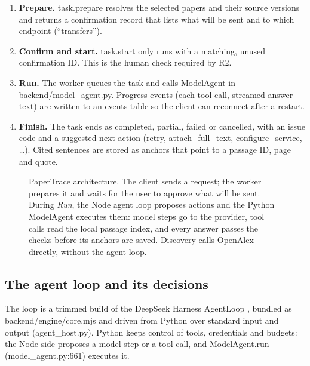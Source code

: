 \documentclass{article}
\newcommand{\code}[1]{{\ttfamily\small\hyphenchar\font=-1\relax #1}}
\begin{document}
\begin{enumerate}
  \item \textbf{Prepare.} \code{task.prepare} resolves the selected papers and their source versions and
  returns a confirmation record that lists what will be sent and to which endpoint (``transfers'').
  \item \textbf{Confirm and start.} \code{task.start} only runs with a matching, unused confirmation ID.
  This is the human check required by R2.
  \item \textbf{Run.} The worker queues the task and calls \code{ModelAgent} in
  \code{backend/model_agent.py}. Progress events (each tool call, streamed answer text) are written to
  an \code{events} table so the client can reconnect after a restart.
  \item \textbf{Finish.} The task ends as \code{completed}, \code{partial}, \code{failed} or
  \code{cancelled}, with an \code{issue} code and a suggested next action (\code{retry},
  \code{attach\_full\_text}, \code{configure\_service}, \ldots). Cited sentences are stored as anchors
  that point to a passage ID, page and quote.
\end{enumerate}

\begin{figure}[H]
  \centering
  
  \caption{PaperTrace architecture. The client sends a request; the worker prepares it and waits for
  the user to approve what will be sent. During \emph{Run}, the Node agent loop proposes actions and the
  Python \code{ModelAgent} executes them: model steps go to the provider, tool calls read the local
  passage index, and every answer passes the checks before its anchors are saved. Discovery calls
  OpenAlex directly, without the agent loop.}
  \label{fig:architecture}
\end{figure}

\subsection{The agent loop and its decisions}
The loop is a trimmed build of the DeepSeek Harness \code{AgentLoop} \citep{dsh}, bundled as
\code{backend/engine/core.mjs} and driven from Python over standard input and output
(\code{agent\_host.py}). Python keeps control of tools, credentials and budgets: the Node side proposes
a model step or a tool call, and \code{ModelAgent.run} (\code{model\_agent.py:661}) executes it.
\end{document}
